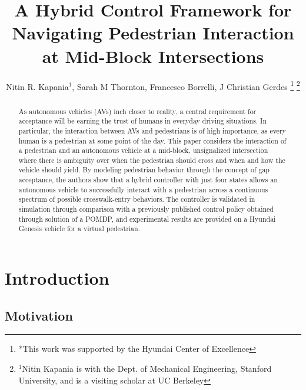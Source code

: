 \documentclass[letterpaper, 10 pt, conference]{ieeeconf}  %
\title{\LARGE \bf
A Hybrid Control Framework for Navigating Pedestrian Interaction at Mid-Block Intersections}
\author{Nitin R. Kapania$^{1}$, Sarah M Thornton, Francesco Borrelli, J Christian Gerdes%
\thanks{*This work was supported by the Hyundai Center of Excellence}%
\thanks{$^{1}$Nitin Kapania is with the Dept. of Mechanical Engineering, Stanford University, and is a visiting scholar at UC Berkeley}%
}
\begin{document}
\maketitle
\thispagestyle{empty}
\pagestyle{empty}


\begin{abstract}

As autonomous vehicles (AVs) inch closer to reality, a central requirement for acceptance will be earning the trust of humans in everyday driving situations. In particular, the interaction between AVs and pedestrians is of
high importance, as every human is a pedestrian at some point of the day. This paper considers the interaction of a pedestrian and an autonomous vehicle at a mid-block, unsignalized intersection where there is ambiguity
over when the pedestrian should cross and when and how the vehicle should yield. By modeling pedestrian behavior through the concept of gap acceptance, the authors show that a hybrid controller with just four states allows an autonomous vehicle to successfully interact with a pedestrian across a continuous spectrum of possible crosswalk-entry behaviors. The controller is validated in simulation through comparison with a previously published control policy obtained through solution of a POMDP, and experimental results are provided on a Hyundai Genesis vehicle for a virtual pedestrian.  

\end{abstract}


\section{Introduction}

\subsection{Motivation}
\end{document}
